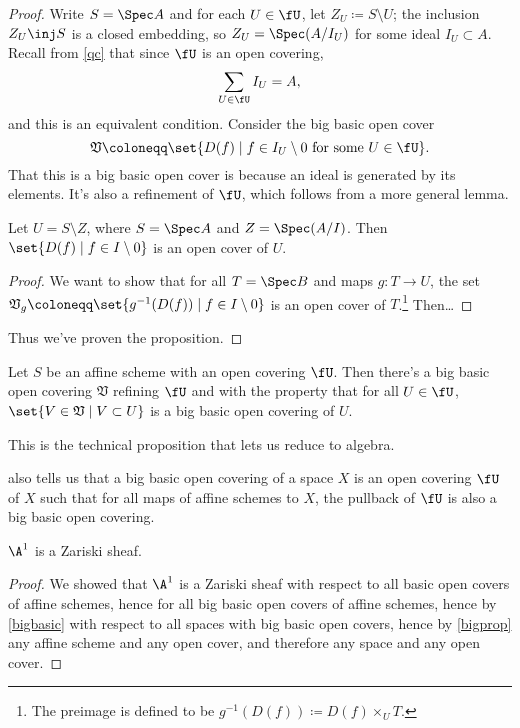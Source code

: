 \begin{proof}
Write $S = \Spec A$ and for each $U\in\fU$, let $Z_U\coloneqq S\setminus U$; the inclusion $Z_U\inj S$ is a closed
embedding, so $Z_U = \Spec(A/I_U)$ for some ideal $I_U\subset A$. Recall from \cref{qc} that since $\fU$ is an open
covering,
\begin{equation}
	\sum_{U\in\fU} I_U = A,
\end{equation}
and this is an equivalent condition. Consider the big basic open cover
\begin{equation}
	\mathfrak V \coloneqq \set{D(f)\mid f\in I_U\setminus 0\text{ for some } U\in\fU}.
\end{equation}
That this is a big basic open cover is because an ideal is generated by its elements. It's also a refinement of
$\fU$, which follows from a more general lemma.
\begin{lem}
Let $U = S\setminus Z$, where $S = \Spec A$ and $Z = \Spec(A/I)$. Then $\set{D(f)\mid f\in I\setminus 0}$ is an
open cover of $U$.
\end{lem}
\begin{proof}
We want to show that for all $T = \Spec B$ and maps $g\colon T\to U$, the set $\mathfrak V_g\coloneqq
\set{g^{-1}(D(f))\mid f\in I\setminus 0}$ is an open cover of $T$.\footnote{The preimage is defined to be
$g^{-1}(D(f))\coloneqq D(f)\times_U T$.} Then\dots \TODO
\end{proof}
Thus we've proven the proposition.
\end{proof}
\begin{cor}
\label{redtoalg}
Let $S$ be an affine scheme with an open covering $\fU$. Then there's a big basic open covering $\mathfrak V$
refining $\fU$ and with the property that for all $U\in\fU$, $\set{V\in\mathfrak V\mid V\subset U}$ is a big basic
open covering of $U$.
\end{cor}
This is the technical proposition that lets us reduce to algebra.
\begin{rem}
\label{bigbasic}
 also tells us that a big basic open covering of a space $X$ is an open covering $\fU$ of $X$ such
that for all maps of affine schemes to $X$, the pullback of $\fU$ is also a big basic open covering.
\end{rem}
\begin{cor}
$\A^1$ is a Zariski sheaf.
\end{cor}
\begin{proof}
We showed that $\A^1$ is a Zariski sheaf with respect to all basic open covers of affine schemes, hence for all big
basic open covers of affine schemes, hence by \cref{bigbasic} with respect to all spaces with big basic open
covers, hence by \cref{bigprop} any affine scheme and any open cover, and therefore any space and any open cover.
\end{proof}
